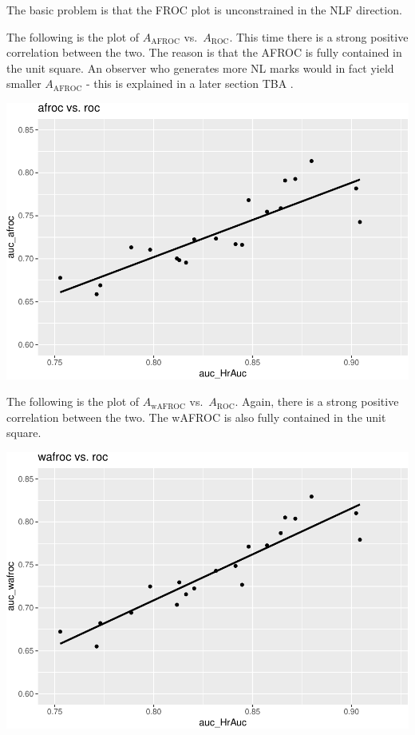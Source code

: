 \documentclass[
]{book}
\begin{document}
The basic problem is that the FROC plot is unconstrained in the NLF direction.

The following is the plot of \(A_{\text{AFROC}}\) vs.~\(A_{\text{ROC}}\). This time there is a strong positive correlation between the two. The reason is that the AFROC is fully contained in the unit square. An observer who generates more NL marks would in fact yield smaller \(A_{\text{AFROC}}\) - this is explained in a later section TBA .

\includegraphics{13a-froc-empirical1_files/figure-latex/unnamed-chunk-20-1.pdf}

The following is the plot of \(A_{\text{wAFROC}}\) vs.~\(A_{\text{ROC}}\). Again, there is a strong positive correlation between the two. The wAFROC is also fully contained in the unit square.

\includegraphics{13a-froc-empirical1_files/figure-latex/unnamed-chunk-21-1.pdf}
\end{document}
